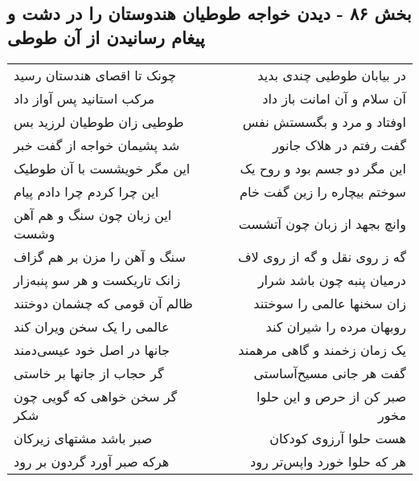 \begin{center}
\section*{بخش ۸۶ - دیدن خواجه طوطیان هندوستان را در دشت و پیغام رسانیدن از آن طوطی}
\label{sec:sh086}
\begin{longtable}{l p{0.5cm} r}
چونک تا اقصای هندستان رسید
&&
در بیابان طوطیی چندی بدید
\\
مرکب استانید پس آواز داد
&&
آن سلام و آن امانت باز داد
\\
طوطیی زان طوطیان لرزید بس
&&
اوفتاد و مرد و بگسستش نفس
\\
شد پشیمان خواجه از گفت خبر
&&
گفت رفتم در هلاک جانور
\\
این مگر خویشست با آن طوطیک
&&
این مگر دو جسم بود و روح یک
\\
این چرا کردم چرا دادم پیام
&&
سوختم بیچاره را زین گفت خام
\\
این زبان چون سنگ و هم آهن وشست
&&
وانچ بجهد از زبان چون آتشست
\\
سنگ و آهن را مزن بر هم گزاف
&&
گه ز روی نقل و گه از روی لاف
\\
زانک تاریکست و هر سو پنبه‌زار
&&
درمیان پنبه چون باشد شرار
\\
ظالم آن قومی که چشمان دوختند
&&
زان سخنها عالمی را سوختند
\\
عالمی را یک سخن ویران کند
&&
روبهان مرده را شیران کند
\\
جانها در اصل خود عیسی‌دمند
&&
یک زمان زخمند و گاهی مرهمند
\\
گر حجاب از جانها بر خاستی
&&
گفت هر جانی مسیح‌آساستی
\\
گر سخن خواهی که گویی چون شکر
&&
صبر کن از حرص و این حلوا مخور
\\
صبر باشد مشتهای زیرکان
&&
هست حلوا آرزوی کودکان
\\
هرکه صبر آورد گردون بر رود
&&
هر که حلوا خورد واپس‌تر رود
\\
\end{longtable}
\end{center}
